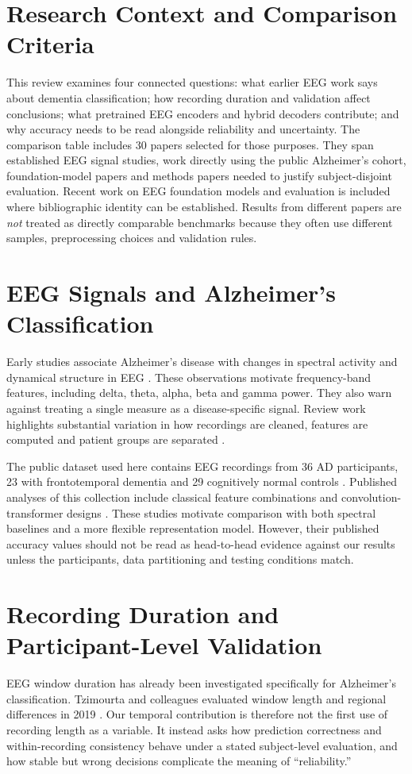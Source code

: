 \section{Research Context and Comparison Criteria}
This review examines four connected questions: what earlier EEG work says about dementia classification; how recording duration and validation affect conclusions; what pretrained EEG encoders and hybrid decoders contribute; and why accuracy needs to be read alongside reliability and uncertainty. The comparison table includes 30 papers selected for those purposes. They span established EEG signal studies, work directly using the public Alzheimer's cohort, foundation-model papers and methods papers needed to justify subject-disjoint evaluation. Recent work on EEG foundation models and evaluation is included where bibliographic identity can be established. Results from different papers are \emph{not} treated as directly comparable benchmarks because they often use different samples, preprocessing choices and validation rules.

\section{EEG Signals and Alzheimer's Classification}
Early studies associate Alzheimer's disease with changes in spectral activity and dynamical structure in EEG \cite{jeong2004,dauwels2010}. These observations motivate frequency-band features, including delta, theta, alpha, beta and gamma power. They also warn against treating a single measure as a disease-specific signal. Review work highlights substantial variation in how recordings are cleaned, features are computed and patient groups are separated \cite{cassani2018,tzimourta2021review}.

The public dataset used here contains EEG recordings from 36 AD participants, 23 with frontotemporal dementia and 29 cognitively normal controls \cite{miltiadous2023dataset}. Published analyses of this collection include classical feature combinations and convolution-transformer designs \cite{zheng2023,dice2023}. These studies motivate comparison with both spectral baselines and a more flexible representation model. However, their published accuracy values should not be read as head-to-head evidence against our results unless the participants, data partitioning and testing conditions match.

\section{Recording Duration and Participant-Level Validation}
EEG window duration has already been investigated specifically for Alzheimer's classification. Tzimourta and colleagues evaluated window length and regional differences in 2019 \cite{tzimourta2019}. Our temporal contribution is therefore not the first use of recording length as a variable. It instead asks how prediction correctness and within-recording consistency behave under a stated subject-level evaluation, and how stable but wrong decisions complicate the meaning of ``reliability.''

